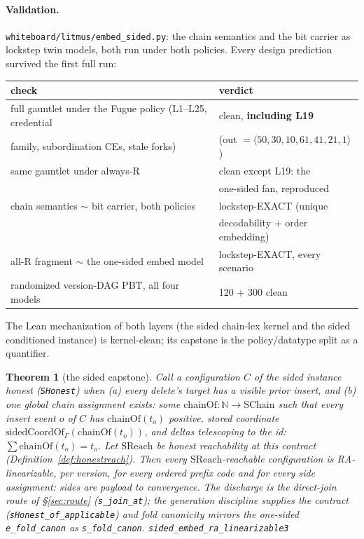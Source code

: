 \documentclass[11pt]{article}
\newtheorem{theorem}{Theorem}[section]
\newcommand{\lean}[1]{\texttt{#1}}
\newcommand{\code}[1]{\texttt{#1}}
\begin{document}
\paragraph{Validation.} \code{whiteboard/litmus/embed\_sided.py}: the
chain semantics and the bit carrier as lockstep twin models, both run
under both policies. Every design prediction survived the first full
run:

\begin{center}\small
\begin{tabular}{@{}ll@{}}
\toprule
check & verdict \\
\midrule
full gauntlet under the Fugue policy (L1--L25, credential & clean,
  \textbf{including L19} \\
\quad family, subordination CEs, stale forks) &
  (out $= \langle 50,30,10,61,41,21,1\rangle$) \\
same gauntlet under always-R & clean except L19: the \\
 & one-sided fan, reproduced \\
chain semantics $\sim$ bit carrier, both policies & lockstep-EXACT
  (unique \\
 & decodability + order embedding) \\
all-R fragment $\sim$ the one-sided embed model & lockstep-EXACT, every
  scenario \\
randomized version-DAG PBT, all four models & 120 + 300 clean \\
\bottomrule
\end{tabular}
\end{center}

\noindent The Lean mechanization of both layers (the sided chain-lex
kernel and the sided conditioned instance) is kernel-clean;
its capstone is the policy/datatype split as a quantifier.

\begin{theorem}[the sided capstone]
\label{thm:sidedcapstone}
Call a configuration $C$ of the sided instance \emph{honest}
(\lean{SHonest}) when (a) every delete's target has a visible prior
insert, and (b) one global chain assignment exists: some
$\mathrm{chainOf} : \mathbb{N} \to \mathrm{SChain}$ such that every
insert event $o$ of $C$ has $\mathrm{chainOf}(t_o)$ positive, stored
coordinate $\mathrm{sidedCoordOf}_\Gamma(\mathrm{chainOf}(t_o))$,
and deltas telescoping to the id: $\sum \mathrm{chainOf}(t_o) =
t_o$. Let $\mathrm{SReach}$ be honest reachability at this contract
(Definition~\ref{def:honestreach}). Then every
$\mathrm{SReach}$-reachable configuration is RA-linearizable, per
version, for every ordered prefix code and for \emph{every side
assignment}: sides are payload to convergence. The discharge is the
direct-join route of \S\ref{sec:route} (\lean{s\_join\_at}); the
generation discipline supplies the contract
(\lean{sHonest\_of\_applicable}) and fold canonicity mirrors the
one-sided \lean{e\_fold\_canon} as \lean{s\_fold\_canon}.
\hfill\lean{sided\_embed\_ra\_linearizable3}
\end{theorem}
\end{document}
